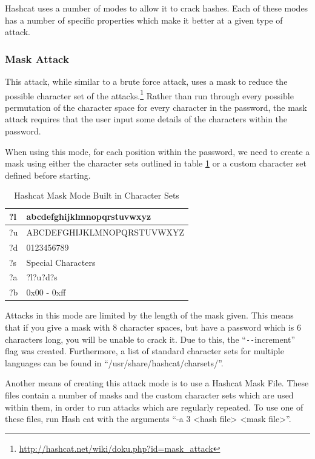 \documentclass[a4paper,11pt]{report}
\begin{document}
			Hashcat uses a number of modes to allow it to crack hashes. 
			Each of these modes has a number of specific properties which make it better at a given type of attack. 

			\subsubsection{Mask Attack}
				This attack, while similar to a brute force attack, uses a mask to reduce the possible character set of the attacks.\footnote{\url{http://hashcat.net/wiki/doku.php?id=mask_attack}} 
				Rather than run through every possible permutation of the character space for every character in the password, the mask attack requires that the user input some details of the characters within the password. 
				
				When using this mode, for each position within the password, we need to create a mask using either the character sets outlined in table \ref{tab:HashcatMaskCharSets} or a custom character set defined before starting. 
				\begin{table}[htb]
					\centering
					\begin{tabular}{| l | l |}
						\hline
						?l & abcdefghijklmnopqrstuvwxyz \\ \hline
						?u & ABCDEFGHIJKLMNOPQRSTUVWXYZ \\ \hline
						?d & 0123456789 \\ \hline
						?s & Special Characters \\ \hline %
						?a & ?l?u?d?s \\ \hline
						?b & 0x00 - 0xff \\ \hline
					\end{tabular}
					\caption{Hashcat Mask Mode Built in Character Sets}
					\label{tab:HashcatMaskCharSets}
				\end{table}
				Attacks in this mode are limited by the length of the mask given. 
				This means that if you give a mask with 8 character spaces, but have a password which is 6 characters long, you will be unable to crack it. 
				Due to this, the ``\verb+--+increment'' flag was created. 
				Furthermore, a list of standard character sets for multiple languages can be found in ``/usr/share/hashcat/charsets/''.

				Another means of creating this attack mode is to use a Hashcat Mask File. 
				These files contain a number of masks and the custom character sets which are used within them, in order to run attacks which are regularly repeated. 
				To use one of these files, run Hash cat with the arguments ``-a 3 <hash file> <mask file>''.
\end{document}
